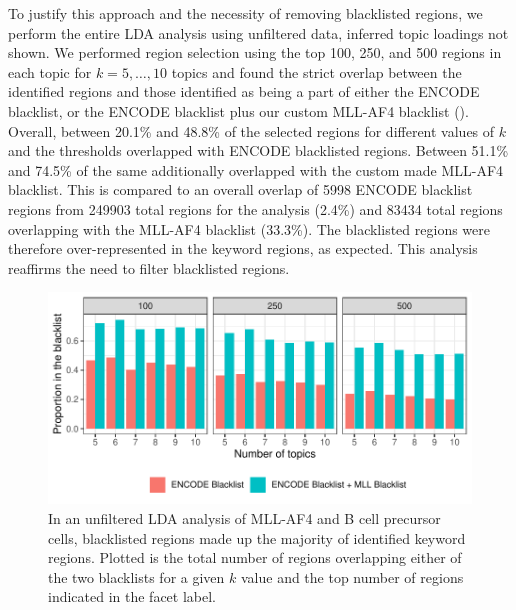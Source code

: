 To justify this approach and the necessity of removing blacklisted regions, we perform the entire LDA analysis using unfiltered data, inferred topic loadings not shown. We performed region selection using the top 100, 250, and 500 regions in each topic for $k=5, \ldots, 10$ topics and found the strict overlap between the identified regions and those identified as being a part of either the ENCODE blacklist, or the ENCODE blacklist plus our custom MLL-AF4 blacklist (). Overall, between 20.1\% and 48.8\% of the selected regions for different values of $k$ and the thresholds overlapped with ENCODE blacklisted regions. Between 51.1\% and 74.5\% of the same additionally overlapped with the custom made MLL-AF4 blacklist. 
This is compared to an overall overlap of 5998 ENCODE blacklist regions from 249903 total regions for the analysis (2.4\%) and 83434 total regions overlapping with the MLL-AF4 blacklist (33.3\%). 
The blacklisted regions were therefore over-represented in the keyword regions, as expected. This analysis reaffirms the need to filter blacklisted regions.

\begin{figure}
    \centering
    \includegraphics[width=\textwidth]{plot/ch5/mll_bl_olap.pdf}
    \caption{In an unfiltered LDA analysis of MLL-AF4 and B cell precursor cells, blacklisted regions made up the majority of identified keyword regions. Plotted is the total number of regions overlapping either of the two blacklists for a given $k$ value and the top number of regions indicated in the facet label. }
    \label{fig:mll_bl_olap}
\end{figure}

